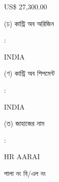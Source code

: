 \documentclass[12pt]{article}
\newcommand{\price}{US\$ 27,300.00}
\newcommand{\co}{INDIA}
\newcommand{\coship}{INDIA}
\newcommand{\vessel}{HR AARAI}
\begin{document}
\begin{minipage}[t]{0.53\linewidth}
{\price}
\\
\end{minipage}
\begin{minipage}[t]{0.05\linewidth}
\hspace*{1em}
\end{minipage}
\begin{minipage}[t]{0.40\linewidth}
(ঢ) কান্ট্রি অব অরিজিন
\end{minipage}
\begin{minipage}[t]{0.02\linewidth}
:
\end{minipage}
\begin{minipage}[t]{0.53\linewidth}
{\co}
\\
\end{minipage}
\begin{minipage}[t]{0.05\linewidth}
\hspace*{1em}
\end{minipage}
\begin{minipage}[t]{0.40\linewidth}
(ণ) কান্ট্রি অব শিপমেন্ট
\end{minipage}
\begin{minipage}[t]{0.02\linewidth}
:
\end{minipage}
\begin{minipage}[t]{0.53\linewidth}
{\coship}
\\
\end{minipage}
\begin{minipage}[t]{0.05\linewidth}
\hspace*{1em}
\end{minipage}
\begin{minipage}[t]{0.40\linewidth}
(ত) জাহাজের নাম
\end{minipage}
\begin{minipage}[t]{0.02\linewidth}
:
\end{minipage}
\begin{minipage}[t]{0.53\linewidth}
{\vessel}
\end{minipage}
\begin{minipage}[t]{0.05\linewidth}
\hspace*{1em}
\end{minipage}
\begin{minipage}[t]{0.40\linewidth}
\hspace*{1.8em}পালা নং বি/এল নং
\end{minipage}
\begin{minipage}[t]{0.02\linewidth}
\hspace{1em}
\end{minipage}
\end{document}
